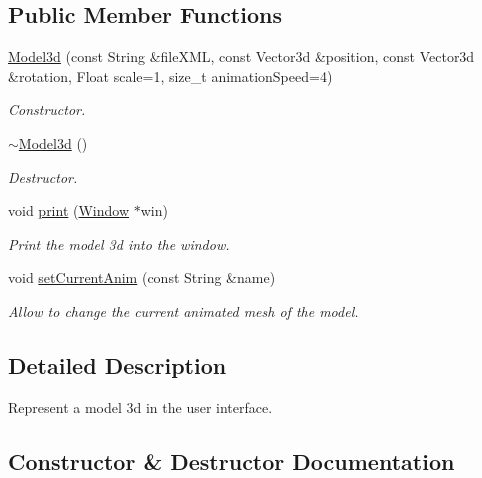 \subsection*{Public Member Functions}
\begin{DoxyCompactItemize}
\item 
\hyperlink{classModel3d_a3382c1519f85b695a1d98b492207c339}{Model3d} (const String \&file\+X\+ML, const Vector3d \&position, const Vector3d \&rotation, Float scale=1, size\+\_\+t animation\+Speed=4)
\begin{DoxyCompactList}\small\item\em Constructor. \end{DoxyCompactList}\item 
\mbox{\label{classModel3d_a7a4ec3be34c901538574d99d95a46b04}} 
\hyperlink{classModel3d_a7a4ec3be34c901538574d99d95a46b04}{$\sim$\+Model3d} ()
\begin{DoxyCompactList}\small\item\em Destructor. \end{DoxyCompactList}\item 
void \hyperlink{classModel3d_ae02d86ac82ec9f435cf1ebe668f3a6dd}{print} (\hyperlink{classWindow}{Window} $\ast$win)
\begin{DoxyCompactList}\small\item\em Print the model 3d into the window. \end{DoxyCompactList}\item 
void \hyperlink{classModel3d_a29eeaa6769b0c21268f4704ac2d404b7}{set\+Current\+Anim} (const String \&name)
\begin{DoxyCompactList}\small\item\em Allow to change the current animated mesh of the model. \end{DoxyCompactList}\end{DoxyCompactItemize}


\subsection{Detailed Description}
Represent a model 3d in the user interface. 

\subsection{Constructor \& Destructor Documentation}
\mbox{\label{classModel3d_a3382c1519f85b695a1d98b492207c339}} 
